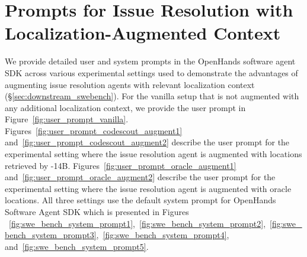 \section{Prompts for Issue Resolution with Localization-Augmented Context}\label{appendix:prompts_swe_bench}
We provide detailed user and system prompts in the OpenHands software agent SDK across various experimental settings used to demonstrate the advantages of augmenting issue resolution agents with relevant localization context (\S\ref{sec:downstream_swebench}). For the vanilla setup that is not augmented with any additional localization context, we provide the user prompt in Figure~\ref{fig:user_prompt_vanilla}. Figures~\ref{fig:user_prompt_codescout_augment1} and~\ref{fig:user_prompt_codescout_augment2} describe the user prompt for the experimental setting where the issue resolution agent is augmented with locations retrieved by \methodname-14B. Figures~\ref{fig:user_prompt_oracle_augment1} and~\ref{fig:user_prompt_oracle_augment2} describe the user prompt for the experimental setting where the issue resolution agent is augmented with oracle locations. All three settings use the default system prompt for OpenHands Software Agent SDK which is presented in Figures ~\ref{fig:swe_bench_system_prompt1},~\ref{fig:swe_bench_system_prompt2},~\ref{fig:swe_bench_system_prompt3},~\ref{fig:swe_bench_system_prompt4}, and~\ref{fig:swe_bench_system_prompt5}. 

